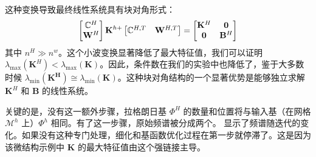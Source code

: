 这种变换导致最终线性系统具有块对角形式：
\begin{equation}
  \begin{bmatrix}\mathbb{C}^H\\ \mathbf{W}^H \end{bmatrix} \mathbf{K}^{h+} \begin{bmatrix} \mathbb{C}^{H,T} & \mathbf{W}^{H, T}\end{bmatrix} = \begin{bmatrix} \mathbf{K}^H & \bold{0}\\ \bold{0} & \mathbf{B}^H \end{bmatrix}
  \label{eq:block-diagonal}
\end{equation}
其中 $n^H \gg n^w$。这个小波变换显著降低了最大特征值，我们可以证明 $\lambda_{\max}(\mathbf{K}^H) <
\lambda_{\max}(\mathbf{K})$。因此，条件数在我们的实验中也降低了，鉴于大多数时候 $\lambda_{\min}(\mathbf{K^H}) \cong
\lambda_{\min}(\mathbf{K})$。这种块对角结构的一个显著优势是能够独立求解 $\mathbf{K}^H$ 和 $\mathbf{B}$ 的线性系统。

关键的是，没有这一额外步骤，拉格朗日基 $\Phi^H$ 的数量和位置将与输入基（在网格 $\mathcal{M}^h$ 上）$\Phi^h$ 相同。有了这一步骤，原始频谱被分成两个。 显示了频谱随迭代的变化。如果没有这种专门处理，细化和基函数优化过程在第一步就停滞了。这是因为该微结构示例中 $\mathbf{K}$ 的最大特征值由这个强链接主导。
